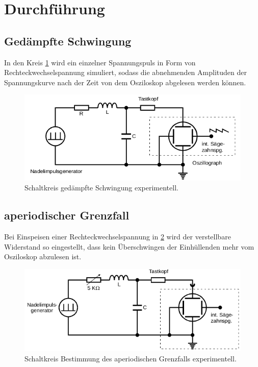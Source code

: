 \section{Durchführung}
\subsection{Gedämpfte Schwingung}
In den Kreis \ref{fig:d1} wird ein einzelner Spannungspuls in Form
von Rechteckwechselspannung simuliert, sodass die
abnehmenden Amplituden der Spannungskurve nach der Zeit von dem Osziloskop abgelesen werden können.
\label{sec:Durchführung}
\begin{figure}[H]
  \centering
  \includegraphics{content/images/d1.png}
  \caption{Schaltkreis gedämpfte Schwingung experimentell\cite{anleitung}.}
  \label{fig:d1}
\end{figure}

\subsection{aperiodischer Grenzfall}
Bei Einspeisen einer Rechteckwechselspannung in \ref{fig:d2} wird der verstellbare
Widerstand so eingestellt, dass kein Überschwingen der Einhüllenden mehr
vom Osziloskop abzulesen ist.
\begin{figure}[H]
  \centering
  \includegraphics{content/images/d2.png}
  \caption{Schaltkreis Bestimmung des aperiodischen Grenzfalls experimentell\cite{anleitung}.}
  \label{fig:d2}
\end{figure}

